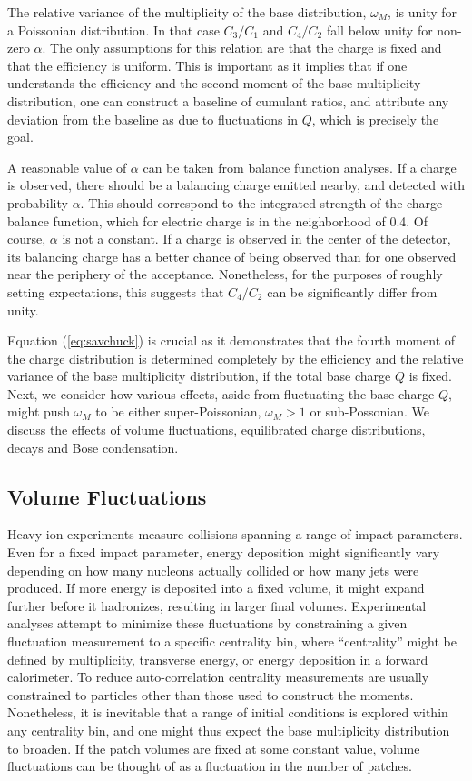 \documentclass[aps,prc,nofootinbib,showpacs,superscriptaddress,groupedaddress]{revtex4-1}
\begin{document}
The relative variance of the multiplicity of the base distribution, $\omega_M$, is unity for a Poissonian distribution. In that case $C_3/C_1$ and $C_4/C_2$ fall below unity for non-zero $\alpha$. The only assumptions for this relation are that the charge is fixed and that the efficiency is uniform. This is important as it implies that if one understands the efficiency and the second moment of the base multiplicity distribution, one can construct a baseline of cumulant ratios, and attribute any deviation from the baseline as due to fluctuations in $Q$, which is precisely the goal.

A reasonable value of $\alpha$ can be taken from balance function analyses. If a charge is observed, there should be a balancing charge emitted nearby, and detected with probability $\alpha$. This should correspond to the integrated strength of the charge balance function, which for electric charge is in the neighborhood of 0.4. Of course, $\alpha$ is not a constant. If a charge is observed in the center of the detector, its balancing charge has a better chance of being observed than for one observed near the periphery of the acceptance. Nonetheless, for the purposes of roughly setting expectations, this suggests that $C_4/C_2$ can be significantly differ from unity. 

Equation (\ref{eq:savchuck}) is crucial as it demonstrates that the fourth moment of the charge distribution is determined completely by the efficiency and the relative variance of the base multiplicity distribution, if the total base charge $Q$ is fixed. Next, we consider how various effects, aside from fluctuating the base charge $Q$, might push $\omega_M$ to be either super-Poissonian, $\omega_M>1$ or sub-Possonian. We discuss the effects of volume fluctuations, equilibrated charge distributions, decays and Bose condensation.

\subsection{Volume Fluctuations}\label{sec:volumefluc}

Heavy ion experiments measure collisions spanning a range of impact parameters. Even for a fixed impact parameter, energy deposition might significantly vary depending on how many nucleons actually collided or how many jets were produced. If more energy is deposited into a fixed volume, it might expand further before it hadronizes, resulting in larger final volumes. Experimental analyses attempt to minimize these fluctuations by constraining a given fluctuation measurement to a specific centrality bin, where ``centrality'' might be defined by multiplicity, transverse energy, or energy deposition in a forward calorimeter. To reduce auto-correlation centrality measurements are usually constrained to particles other than those used to construct the moments. Nonetheless, it is inevitable that a range of initial conditions is explored within any centrality bin, and one might thus expect the base multiplicity distribution to broaden. If the patch volumes are fixed at some constant value, volume fluctuations can be thought of as a fluctuation in the number of patches. 
\end{document}
